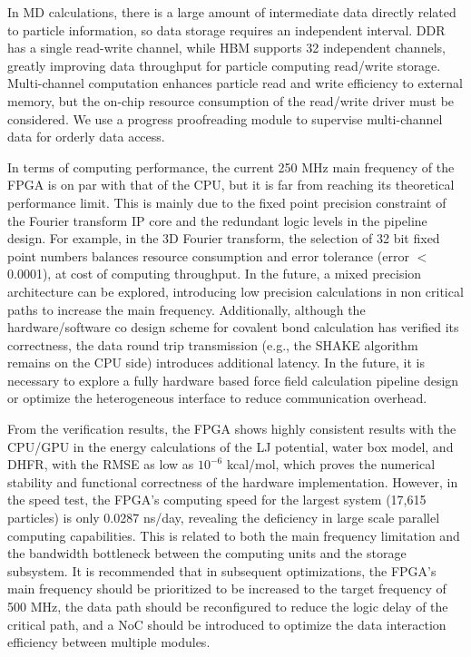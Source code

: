 \documentclass{article}
\begin{document}
In MD calculations, there is a large amount of intermediate data directly 
related to particle information, so data storage requires an independent 
interval. 
DDR has a single read-write channel, while HBM supports 32 independent 
channels, greatly improving data throughput for particle computing read/write 
storage. 
Multi-channel computation enhances particle read and write efficiency to 
external memory, but the on-chip resource consumption of the read/write driver 
must be considered. 
We use a progress proofreading module to supervise multi-channel data for 
orderly data access.

In terms of computing performance, the current 250 MHz main frequency of the 
FPGA is on par with that of the CPU, but it is far from reaching its 
theoretical performance limit. 
This is mainly due to the fixed point precision constraint of the Fourier 
transform IP core and the redundant logic levels in the pipeline design. 
For example, in the 3D Fourier transform, the selection of 32 bit fixed point 
numbers balances resource consumption and error tolerance (error $<$ 0.0001), 
at cost of computing throughput. 
In the future, a mixed  precision architecture can be explored, introducing low 
precision calculations in non  critical paths to increase the main frequency. 
Additionally, although the hardware/software co design scheme for covalent 
bond calculation has verified its correctness, the data round trip transmission 
(e.g., the SHAKE algorithm remains on the CPU side) introduces additional 
latency. 
In the future, it is necessary to explore a fully hardware based force field 
calculation pipeline design or optimize the heterogeneous interface to reduce 
communication overhead.

From the verification results, the FPGA shows highly consistent results with 
the CPU/GPU in the energy calculations of the LJ potential, water box model, 
and DHFR, with the RMSE as low as $10^{-6}$  kcal/mol, which proves the 
numerical stability and functional correctness of the hardware implementation. 
However, in the speed test, the FPGA's computing speed for the largest system 
(17,615 particles) is only 0.0287 ns/day, revealing the deficiency in large 
scale parallel computing capabilities. 
This is related to both the main frequency limitation and the bandwidth 
bottleneck between the computing units and the storage subsystem. 
It is recommended that in subsequent optimizations, the FPGA's main frequency 
should be prioritized to be increased to the target frequency of 500 MHz, the 
data path should be reconfigured to reduce the logic delay of the critical 
path, and a NoC should be introduced to optimize the data interaction 
efficiency between multiple modules.
\end{document}
